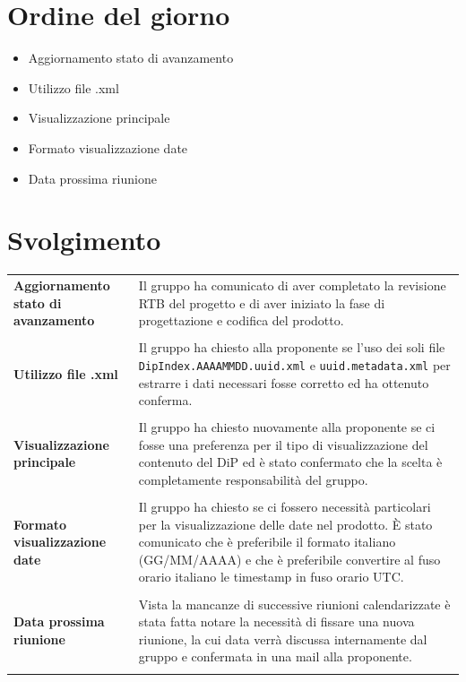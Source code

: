 \documentclass[a4paper,12pt]{article}
\begin{document}
    

    \newpage
    \tableofcontents
    \newpage

    \section{Ordine del giorno}
        \begin{itemize}
            \item Aggiornamento stato di avanzamento
            \item Utilizzo file .xml
            \item Visualizzazione principale
            \item Formato visualizzazione date
            \item Data prossima riunione
        \end{itemize}

    \section{Svolgimento}
        \begin{longtable}{p{5cm}|p{10cm}}
            \textbf{Aggiornamento stato di avanzamento} & Il gruppo ha comunicato di aver completato la revisione RTB del progetto e di aver iniziato la fase di progettazione e codifica del prodotto. \\\\
            \textbf{Utilizzo file .xml} & Il gruppo ha chiesto alla proponente se l'uso dei soli file \verb|DipIndex.AAAAMMDD.uuid.xml| e \verb|uuid.metadata.xml| per estrarre i dati necessari fosse corretto ed ha ottenuto conferma. \\\\
            \textbf{Visualizzazione principale} & Il gruppo ha chiesto nuovamente alla proponente se ci fosse una preferenza per il tipo di visualizzazione del contenuto del DiP ed è stato confermato che la scelta è completamente responsabilità del gruppo. \\\\
            \textbf{Formato visualizzazione date} & Il gruppo ha chiesto se ci fossero necessità particolari per la visualizzazione delle date nel prodotto. È stato comunicato che è preferibile il formato italiano (GG/MM/AAAA) e che è preferibile convertire al fuso orario italiano le timestamp in fuso orario UTC. \\\\
            \textbf{Data prossima riunione} & Vista la mancanze di successive riunioni calendarizzate è stata fatta notare la necessità di fissare una nuova riunione, la cui data verrà discussa internamente dal gruppo e confermata in una mail alla proponente. \\\\
        \end{longtable}
\end{document}
